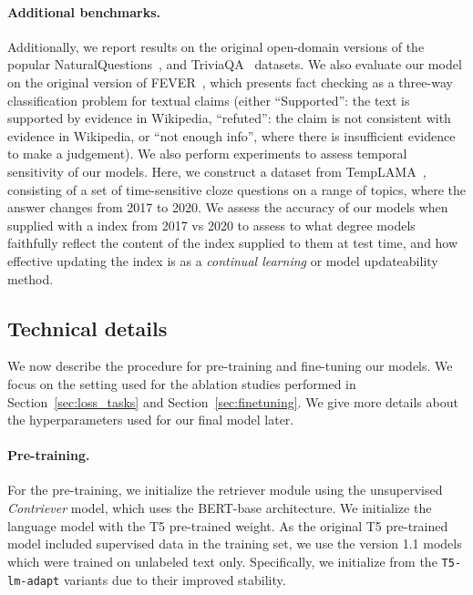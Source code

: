 \documentclass[10pt]{article} \usepackage[preprint]{tmlr}
\begin{document}
\paragraph{Additional benchmarks.} Additionally, we report results on the original open-domain versions of the popular NaturalQuestions~\citep{kwiatkowski2019natural}, and TriviaQA~\citep{JoshiTriviaQA2017} datasets.
We also evaluate our model on the original version of FEVER~\citep{thorne2018fever}, which presents fact checking as a three-way classification problem for textual claims (either ``Supported'': the text is supported by evidence in Wikipedia, ``refuted'': the claim is not consistent with evidence in Wikipedia, or ``not enough info'', where there is insufficient evidence to make a judgement).
We also perform experiments to assess temporal sensitivity of our models. Here, we construct a dataset from TempLAMA~\citep{dhingra-etal-2022-time}, consisting of a set of time-sensitive cloze questions on a range of topics, where the answer changes from 2017 to 2020. 
We assess the accuracy of our models when supplied with a index from 2017 vs 2020 to assess to what degree models faithfully reflect the content of the index supplied to them at test time, and how effective updating the index is as a \emph{continual learning} or model updateability method.

\subsection{Technical details}
\label{sec:training}

We now describe the procedure for pre-training and fine-tuning our models. We focus on the setting used for the ablation studies performed in Section~\ref{sec:loss_tasks} and Section~\ref{sec:finetuning}. 
We give more details about the hyperparameters used for our final model later.

\paragraph{Pre-training.} For the pre-training, we initialize the retriever module using the unsupervised \emph{Contriever} model, which uses the BERT-base architecture.
We initialize the language model with the T5 pre-trained weight.
As the original T5 pre-trained model included supervised data in the training set, we use the version 1.1 models which were trained on unlabeled text only.
Specifically, we initialize from the \texttt{T5-lm-adapt} variants due to their improved stability.
\end{document}
